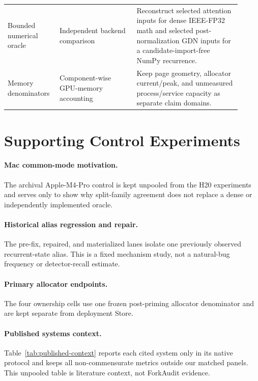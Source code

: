\documentclass{article}
\begin{document}
\begin{table}[H]
\begin{tabular}{@{}p{0.18\linewidth}p{0.31\linewidth}p{0.42\linewidth}@{}}
Bounded numerical oracle & Independent backend comparison~\citep{pham2019cradle} & Reconstruct selected attention inputs for dense IEEE-FP32 math and selected post-normalization GDN inputs for a candidate-import-free NumPy recurrence. \\
Memory denominators & Component-wise GPU-memory accounting~\citep{gao2020dnnmem} & Keep page geometry, allocator current/peak, and unmeasured process/service capacity as separate claim domains. \\
\bottomrule
\end{tabular}
\end{table}

\FloatBarrier

\section{Supporting Control Experiments}
\label{app:controls}

\paragraph{Mac common-mode motivation.}
The archival Apple-M4-Pro control is kept unpooled from the H20 experiments and
serves only to show why split-family agreement does not replace a dense or
independently implemented oracle.


\paragraph{Historical alias regression and repair.}
The pre-fix, repaired, and materialized lanes isolate one previously observed
recurrent-state alias.  This is a fixed mechanism study, not a natural-bug
frequency or detector-recall estimate.


\paragraph{Primary allocator endpoints.}
The four ownership cells use one frozen post-priming allocator denominator and
are kept separate from deployment Store.


\paragraph{Published systems context.}
Table~\ref{tab:published-context} reports each cited system only in its native
protocol and keeps all non-commensurate metrics outside our matched panels.
This unpooled table is literature context, not ForkAudit evidence.

\end{document}
